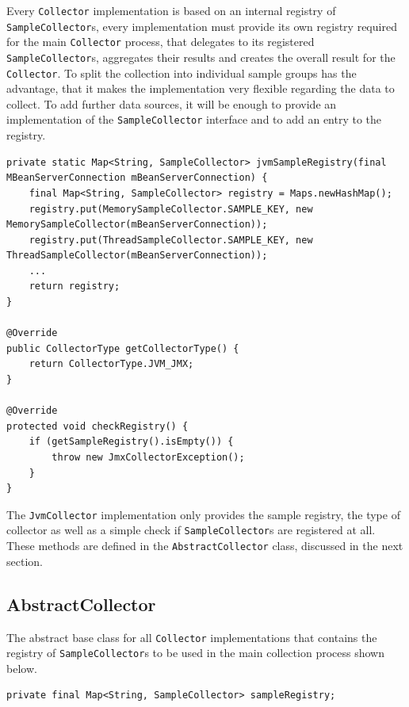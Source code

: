 Every \verb|Collector| implementation is based on an internal registry of \verb|SampleCollector|s, every implementation must provide its
own registry required for the main  \verb|Collector| process, that delegates to its registered \verb|SampleCollector|s,
aggregates their results and creates the overall result for the \verb|Collector|. To split the collection into individual sample groups has
the advantage, that it makes the implementation very flexible regarding the data to collect. To add further data sources, it
will be enough to provide an implementation of the \verb|SampleCollector| interface and to add an entry to the registry.

\begin{lstlisting}[caption={Sample registry for "JvmCollector"}, captionpos=b, label={lst:jvmsampleregistry}]
private static Map<String, SampleCollector> jvmSampleRegistry(final MBeanServerConnection mBeanServerConnection) {
    final Map<String, SampleCollector> registry = Maps.newHashMap();
    registry.put(MemorySampleCollector.SAMPLE_KEY, new MemorySampleCollector(mBeanServerConnection));
    registry.put(ThreadSampleCollector.SAMPLE_KEY, new ThreadSampleCollector(mBeanServerConnection));
    ...
    return registry;
}

@Override
public CollectorType getCollectorType() {
    return CollectorType.JVM_JMX;
}

@Override
protected void checkRegistry() {
    if (getSampleRegistry().isEmpty()) {
        throw new JmxCollectorException();
    }
}
\end{lstlisting}

The \verb|JvmCollector| implementation only provides the sample registry, the type of collector as well as a simple check if \verb|SampleCollector|s
are registered at all. These methods are defined in the \verb|AbstractCollector| class, discussed in the next section.

\subsection{AbstractCollector}

The abstract base class for all \verb|Collector| implementations that contains the registry of \verb|SampleCollector|s to be used in the main
collection process shown below.

\begin{lstlisting}[caption={"AbstractCollector" sample registry}, captionpos=b, label={lst:abstract-collectorsample-registry}]
private final Map<String, SampleCollector> sampleRegistry;
\end{lstlisting}

